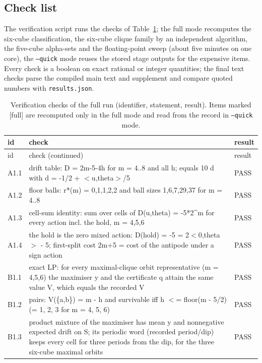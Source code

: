 \documentclass[11pt,a4paper]{article}
\theoremstyle{plain}
\theoremstyle{definition}
\theoremstyle{remark}
\begin{document}
\subsection{Check list}
The verification script  runs the checks of Table~\ref{tab:S8checks}; the full mode recomputes the six-cube classification, the six-cube clique family by an independent algorithm, the five-cube alpha-sets and the floating-point sweep (about five minutes on one core), the \texttt{--quick} mode reuses the stored stage outputs for the expensive items. Every check is a boolean on exact rational or integer quantities; the final text checks parse the compiled main text and supplement and compare quoted numbers with \texttt{results.json}.
{\scriptsize
\begin{longtable}{@{}l p{} l@{}}
\caption{Verification checks of the full run (identifier, statement, result). Items marked [full] are recomputed only in the full mode and read from the record in \texttt{--quick} mode.}\label{tab:S8checks}\\
\toprule id & check & result\\ \midrule
\endfirsthead
\toprule id & check (continued) & result\\ \midrule
\endhead
\bottomrule
\endfoot
A1.1 & drift table: D = 2m-5-4h for m = 4..8 and all h; equals 10 d with d = -1/2 + $<$u,theta$>$/5 & PASS\\
A1.2 & floor balls: r*(m) = 0,1,1,2,2 and ball sizes 1,6,7,29,37 for m = 4..8 & PASS\\
A1.3 & cell-sum identity: sum over cells of D(u,theta) = -5*2\^{}m for every action incl. the hold, m = 4,5,6 & PASS\\
A1.4 & the hold is the zero mixed action: D(hold) = -5 = 2$<$0,theta$>$ - 5; first-split cost 2m+5 = cost of the antipode under a sign action & PASS\\
B1.1 & exact LP: for every maximal-clique orbit representative (m = 4,5,6) the maximiser y and the certificate q attain the same value V, which equals the recorded V & PASS\\
B1.2 & pairs: V(\{a,b\}) = m - h and survivable iff h $<$= floor(m - 5/2) (= 1, 2, 3 for m = 4, 5, 6) & PASS\\
B1.3 & product mixture of the maximiser has mean y and nonnegative expected drift on S; its periodic word (recorded period/dip) keeps every cell for three periods from the dip, for the three six-cube maximal orbits & PASS\\

\end{longtable}}
\end{document}
